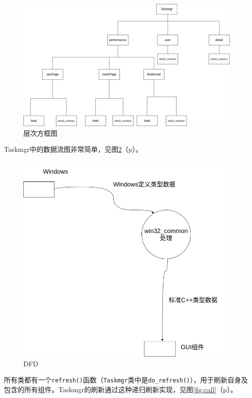 \documentclass[UTF8,twoside,titlepage]{ctexart}
\newcommand\code[1]{\texttt{#1}}
\newcommand\myref[1]{\ref{#1}（p\pageref{#1}）}
\begin{document}
\begin{figure}
    \centering
    \includegraphics[angle=90,scale=0.5]{../dia/层次方框图.png}
    \caption{层次方框图}
    \label{fig:ccfk}
\end{figure}

Taskmgr中的数据流图非常简单，见图\myref{fig:dfd}。

\begin{figure}[htb]
    \centering
    \includegraphics[scale=0.32]{../dia/DFD.png}
    \caption{DFD}
    \label{fig:dfd}
\end{figure}

所有类都有一个\code{refresh()}函数（\code{Taskmgr}类中是\code{do\_refresh()}），用于刷新自身及包含的所有组件。Taskmgr的刷新通过这种递归刷新实现，见图\myref{fig:call}。
\end{document}
